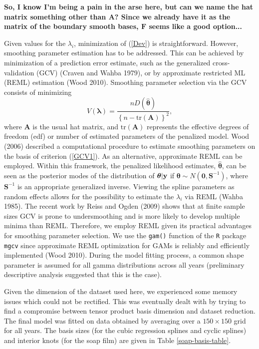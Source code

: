 \documentclass[10pt] {article}
\newcommand{\beq}{\begin{equation}}
\newcommand{\eeq}{\end{equation}}
\theoremstyle{definition}
\theoremstyle{plain}
\begin{document}
{\bf So, I know I'm being a pain in the arse here, but can we name the hat matrix something other than $\bm{A}$? Since we already have it as the matrix of the boundary smooth bases, $\bm{F}$ seems like a good option...}

Given values for the $\lambda_i$, minimization of (\ref{Dev}) is straightforward. However, smoothing parameter estimation has to be addressed. This can be achieved by minimization of a prediction error estimate, such as the generalized cross-validation (GCV) (Craven and Wahba 1979), or by approximate restricted ML (REML) estimation (Wood 2010). Smoothing parameter selection via the GCV consists of minimizing 
\beq
V(\bm\lambda)=\frac{nD(\hat{\bm\theta})}{\left\{n-\text{tr}(\textbf{A})\right\}^2},
\label{GCV1}
\eeq
where $\textbf{A}$ is the usual hat matrix, and $\text{tr}(\textbf{A})$ represents the effective degrees of freedom (edf) or number of estimated parameters of the penalized model. Wood (2006) described a computational procedure to estimate smoothing parameters on the basis of criterion (\ref{GCV1}). As an alternative, approximate REML can be employed. Within this framework, the penalized likelihood estimates, $\hat{\bm\theta}$, can be seen as the posterior modes of the distribution of $\bm\theta|{\bf y}$ if $\bm\theta \sim N(\textbf{0},\textbf{S}^{-1})$, where $\textbf{S}^{-1}$ is an appropriate generalized inverse. Viewing the spline parameters as random effects allows for the possibility to estimate the $\lambda_i$ via REML (Wahba 1985). The recent work by Reiss and Ogden (2009) shows that at finite sample sizes GCV is prone to undersmoothing and is more likely to develop multiple minima than REML. Therefore, we employ REML given its practical advantages for smoothing parameter selection. We use the \texttt{gam()} function of the \texttt{R} package \texttt{mgcv} since approximate REML optimization for GAMs is reliably and efficiently implemented (Wood 2010). During the model fitting process, a common shape parameter is assumed for all gamma distributions across all years (preliminary descriptive analysis suggested that this is the case).

Given the dimension of the dataset used here, we experienced some memory issues which could not be rectified. This was eventually dealt with by trying to find a compromise between tensor product basis dimension and dataset reduction. The final model was fitted on data obtained by averaging over a $150\times150$ grid for all years. The basis sizes (for the cubic regression splines and cyclic splines) and interior knots (for the soap film) are given in Table \ref{soap-basis-table}.
\end{document}
